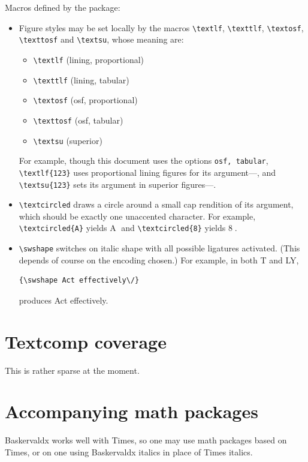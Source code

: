 \documentclass[11pt]{article}
\begin{document}
Macros defined by the package: 
\begin{itemize}
\item
Figure styles may be set locally by the macros \verb|\textlf|, \verb|\texttlf|, \verb|\textosf|, \verb|\texttosf| and \verb|\textsu|, whose meaning are:
\begin{itemize}
\item
\verb|\textlf| (lining, proportional)
\item \verb|\texttlf| (lining, tabular)
\item \verb|\textosf| (osf, proportional)
\item \verb|\texttosf| (osf, tabular)
\item \verb|\textsu| (superior)
\end{itemize}
For example, though this document uses the options {\tt osf, tabular}, \verb|\textlf{123}| uses proportional lining figures for its argument---, and  \verb|\textsu{123}| sets its argument in superior figures---.
\item \verb|\textcircled| draws a circle around a small cap rendition of its argument, which should be exactly one unaccented character. 
For example, \verb|\textcircled{A}| yields \textcircled{A} and \verb|\textcircled{8}| yields \textcircled{8}.
\item \verb|\swshape| switches on italic shape with all possible ligatures activated. (This depends of course on the encoding chosen.) For example, in both T and LY,
\begin{verbatim}
{\swshape Act effectively\/}
\end{verbatim}
 produces {\swshape Act effectively\/}. 
\end{itemize}
\newpage
\section*{Textcomp coverage}
This is rather sparse at the moment.



\section*{Accompanying math packages}
Baskervaldx works well with Times, so one may use math packages based on Times, or on one using Baskervaldx italics in place of Times italics.
 
\end{document}
